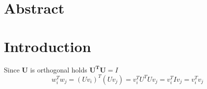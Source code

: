 \documentclass[%
oneside,                 %
final,                   %
10pt]{article}
\begin{document}







\thispagestyle{empty}


\tableofcontents
\newpage
\section{Abstract}
\section{Introduction}

Since $\mathbf{U}$ is orthogonal holds $\mathbf{U^TU} = I$
\begin{equation}
w_i^Tw_j = (Uv_i)^T(Uv_j)=v_i^TU^TUv_j=v_i^TIv_j = v_i^Tv_j
\end{equation}
\end{document}
